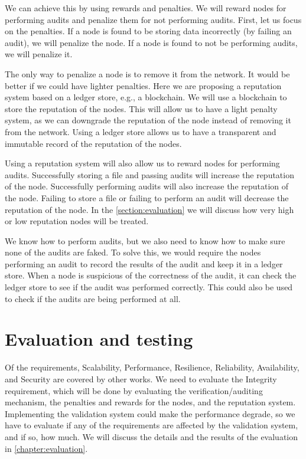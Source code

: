 We can achieve this by using rewards and penalties.
We will reward nodes for performing audits and penalize them for not performing audits.
First, let us focus on the penalties.
If a node is found to be storing data incorrectly (by failing an audit), we will penalize the node.
If a node is found to not be performing audits, we will penalize it.

The only way to penalize a node is to remove it from the network.
It would be better if we could have lighter penalties.
Here we are proposing a reputation system based on a ledger store, e.g., a blockchain.
We will use a blockchain to store the reputation of the nodes.
This will allow us to have a light penalty system, as we can downgrade the reputation of the node
instead of removing it from the network.
Using a ledger store allows us to have a transparent and immutable record of the reputation of the nodes.

Using a reputation system will also allow us to reward nodes for performing audits.
Successfully storing a file and passing audits will increase the reputation of the node.
Successfully performing audits will also increase the reputation of the node.
Failing to store a file or failing to perform an audit will decrease the reputation of the node.
In the \ref{section:evaluation} we will discuss how very high or low reputation nodes will be treated.

We know how to perform audits, but we also need to know how to make sure none of the
audits are faked.
To solve this, we would require the nodes performing an audit to record the results of the audit and keep
it in a ledger store.
When a node is suspicious of the correctness of the audit, it can check the ledger store to see if the audit
was performed correctly.
This could also be used to check if the audits are being performed at all.

\label{section:evaluation}
\section{Evaluation and testing}

Of the requirements, Scalability, Performance, Resilience, Reliability, Availability, and Security
are covered by other works.
We need to evaluate the Integrity requirement, which will be done by evaluating the verification/auditing mechanism,
the penalties and rewards for the nodes, and the reputation system.
Implementing the validation system could make the performance degrade, so we have to evaluate
if any of the requirements are affected by the validation system, and if so, how much.
We will discuss the details and the results of the evaluation in \ref{chapter:evaluation}.
